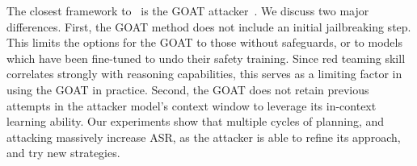 The closest framework to \methodname~is the GOAT attacker~\citep{pavlova2024automatedredteaminggoat}. We discuss two major differences. First, the GOAT method does not include an initial jailbreaking step. This limits the options for the GOAT to those without safeguards, or to models which have been fine-tuned to undo their safety training. 
Since red teaming skill correlates strongly with reasoning capabilities, this serves as a limiting factor in using the GOAT in practice. Second, the GOAT does not retain previous attempts in the attacker model's context window to leverage its in-context learning ability. Our experiments show that multiple cycles of planning, and attacking massively increase ASR, as the attacker is able to refine its approach, and try new strategies.




